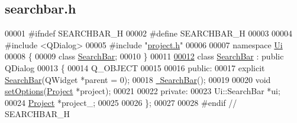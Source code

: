 \hypertarget{searchbar_8h_source}{}\subsection{searchbar.\+h}
\label{searchbar_8h_source}

\begin{DoxyCode}
00001 \textcolor{preprocessor}{#ifndef SEARCHBAR\_H}
00002 \textcolor{preprocessor}{#define SEARCHBAR\_H}
00003 
00004 \textcolor{preprocessor}{#include <QDialog>}
00005 \textcolor{preprocessor}{#include "\hyperlink{project_8h}{project.h}"}
00006 
00007 \textcolor{keyword}{namespace }\hyperlink{namespace_ui}{Ui}
00008 \{
00009 \textcolor{keyword}{class }\hyperlink{class_search_bar}{SearchBar};
00010 \}
00011 
\hypertarget{searchbar_8h_source_l00012}{}\hyperlink{class_search_bar}{00012} \textcolor{keyword}{class }\hyperlink{class_search_bar}{SearchBar} : \textcolor{keyword}{public} QDialog
00013 \{
00014   Q\_OBJECT
00015 
00016 \textcolor{keyword}{public}:
00017   \textcolor{keyword}{explicit} \hyperlink{class_search_bar_a75f8caf009094148f56149b00996ac84}{SearchBar}(QWidget *parent = 0);
00018   \hyperlink{class_search_bar_a553f2c7b9c15e7ae39cf988a6ef8f786}{~SearchBar}();
00019 
00020   \textcolor{keywordtype}{void} \hyperlink{class_search_bar_a840eb8fbdea559d31a7c2af6a4cbc480}{setOptions}(\hyperlink{class_project}{Project} *project);
00021 
00022 \textcolor{keyword}{private}:
00023   Ui::SearchBar *ui;
00024   \hyperlink{class_project}{Project} *project\_;
00025 
00026 \};
00027 
00028 \textcolor{preprocessor}{#endif  // SEARCHBAR\_H}
\end{DoxyCode}
